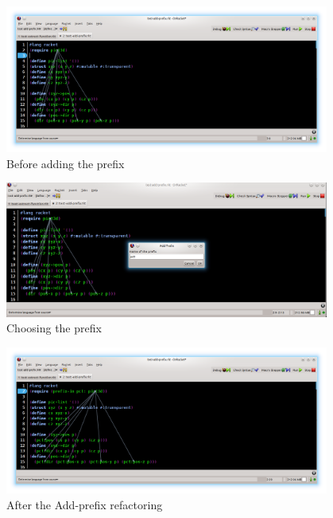 \begin{figure}[htbp]
	\centering
	\includegraphics[width=0.95\textwidth]{img/add-prefix.png}
	\caption{Before adding the prefix}
	\label{fig:addPrefixBefore}
\end{figure}

\begin{figure}[htbp]
	\centering
	\includegraphics[width=0.95\textwidth]{img/add-prefix1.png}
	\caption{Choosing the prefix}
	\label{fig:addPrefixDuring}
\end{figure}

\begin{figure}[htbp]
	\centering
	\includegraphics[width=0.95\textwidth]{img/add-prefix2.png}
	\caption{After the Add-prefix refactoring}
	\label{fig:addPrefixAfter}
\end{figure}